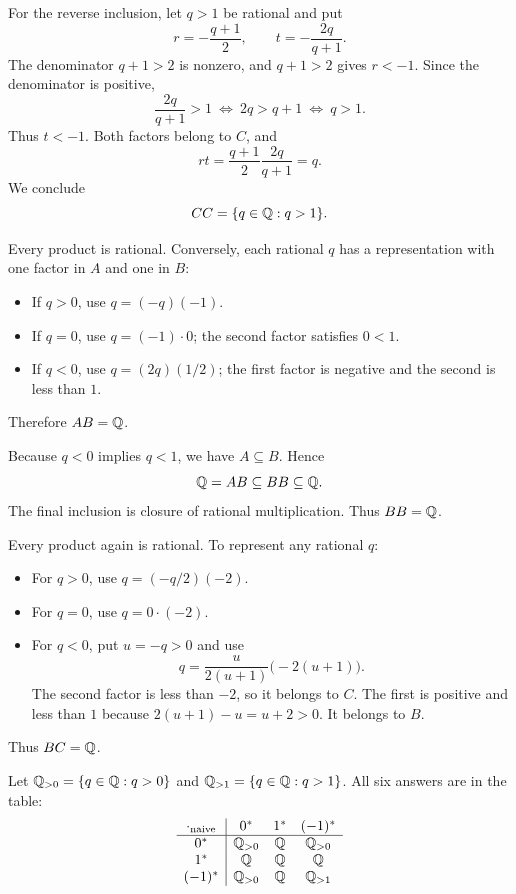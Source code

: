 For the reverse inclusion, let $q>1$ be rational and put
\[
 r=-\frac{q+1}{2},\qquad t=-\frac{2q}{q+1}.
\]
The denominator $q+1>2$ is nonzero, and $q+1>2$ gives $r<-1$.
Since the denominator is positive,
\[
 \frac{2q}{q+1}>1
 \ \Longleftrightarrow\ 2q>q+1
 \ \Longleftrightarrow\ q>1.
\]
Thus $t<-1$. Both factors belong to $C$, and
\[
 rt=\frac{q+1}{2}\frac{2q}{q+1}=q.
\]
We conclude
\[
 CC=\{q\in\mathbb{Q}:q>1\}.
\]

Every product is rational. Conversely, each rational $q$ has a
representation with one factor in $A$ and one in $B$:
\begin{itemize}
 \item If $q>0$, use $q=(-q)(-1)$.
 \item If $q=0$, use $q=(-1)\cdot0$; the second factor satisfies $0<1$.
 \item If $q<0$, use $q=(2q)(1/2)$; the first factor is negative
       and the second is less than $1$.
\end{itemize}
Therefore $AB=\mathbb{Q}$.

Because $q<0$ implies $q<1$, we have $A\subseteq B$. Hence
\[
 \mathbb{Q}=AB\subseteq BB\subseteq\mathbb{Q}.
\]
The final inclusion is closure of rational multiplication.
Thus $BB=\mathbb{Q}$.

Every product again is rational. To represent any rational $q$:
\begin{itemize}
 \item For $q>0$, use $q=(-q/2)(-2)$.
 \item For $q=0$, use $q=0\cdot(-2)$.
 \item For $q<0$, put $u=-q>0$ and use
       \[
        q=\frac{u}{2(u+1)}\bigl(-2(u+1)\bigr).
       \]
       The second factor is less than $-2$, so it belongs to $C$.
       The first is positive and less than $1$ because
       $2(u+1)-u=u+2>0$. It belongs to $B$.
\end{itemize}
Thus $BC=\mathbb{Q}$.

Let $\mathbb{Q}_{>0}=\{q\in\mathbb{Q}:q>0\}$ and
$\mathbb{Q}_{>1}=\{q\in\mathbb{Q}:q>1\}$. All six answers are in the table:
\[
 \begin{array}{c|ccc}
  \mathbin{\cdot_{\rm naive}}&0^*&1^*&(-1)^*\\ \hline
  0^*&\mathbb{Q}_{>0}&\mathbb{Q}&\mathbb{Q}_{>0}\\
  1^*&\mathbb{Q}&\mathbb{Q}&\mathbb{Q}\\
  (-1)^*&\mathbb{Q}_{>0}&\mathbb{Q}&\mathbb{Q}_{>1}
 \end{array}
\]

